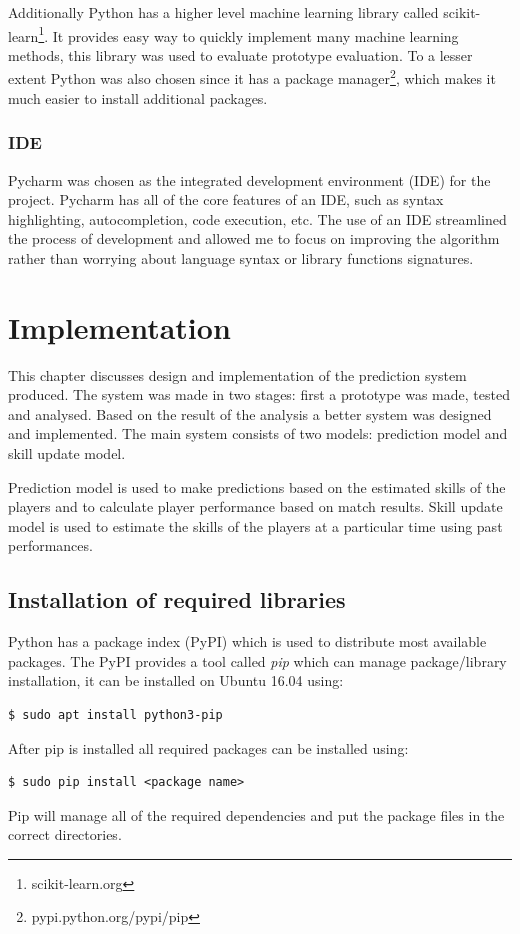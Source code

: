\documentclass[12pt,a4paper]{book}
\begin{document}
Additionally Python has a higher level machine learning library called scikit-learn\footnote{scikit-learn.org}.
It provides easy way to quickly implement many machine learning methods, this library was used to evaluate prototype evaluation.
To a lesser extent Python was also chosen since it has a package manager\footnote{pypi.python.org/pypi/pip}, which makes it much easier to install additional packages.

\subsection{IDE}
Pycharm was chosen as the integrated development environment (IDE) for the project.
Pycharm has all of the core features of an IDE, such as syntax highlighting, autocompletion, code execution, etc.
The use of an IDE streamlined the process of development and allowed me to focus on improving the algorithm rather than worrying about language syntax or library functions signatures. 


\chapter{Implementation}
This chapter discusses design and implementation of the prediction system produced.
The system was made in two stages: first a prototype was made, tested and analysed.
Based on the result of the analysis a better system was designed and implemented.
The main system consists of two models: prediction model and skill update model.

Prediction model is used to make predictions based on the estimated skills of the players and to calculate player performance based on match results.
Skill update model is used to estimate the skills of the players at a particular time using past performances.
\section{Installation of required libraries}
Python has a package index (PyPI) which is used to distribute most available packages.
The PyPI provides a tool called \emph{pip} which can manage package/library installation, it can be installed on Ubuntu 16.04 using:
\begin{verbatim}
$ sudo apt install python3-pip
\end{verbatim}
After pip is installed all required packages can be installed using:
\begin{verbatim}
$ sudo pip install <package name>
\end{verbatim}
Pip will manage all of the required dependencies and put the package files in the correct directories.
\end{document}
